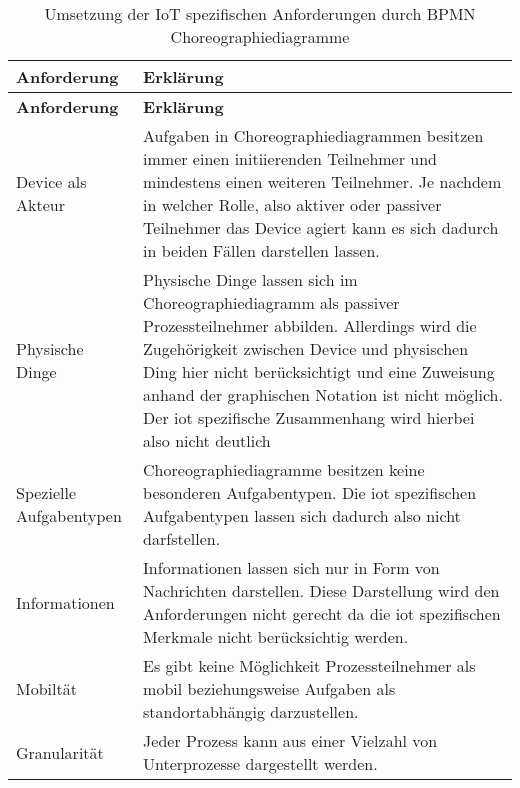  \begin{longtable}{P{4cm}|X}
  \caption{Umsetzung der IoT spezifischen Anforderungen durch BPMN Choreographiediagramme}\\
  \label{table:evaluierungskriterien}
  \textbf{Anforderung} & \textbf{Erklärung}   \\
  \hline
  \endfirsthead %
  \textbf{Anforderung} & \textbf{Erklärung}  \\
  \hline
  \endhead %
  Device als Akteur & Aufgaben in Choreographiediagrammen besitzen immer einen initiierenden Teilnehmer und mindestens einen weiteren Teilnehmer. Je nachdem in welcher Rolle, also aktiver oder passiver Teilnehmer das Device agiert kann es sich dadurch in beiden Fällen darstellen lassen.\\ \hline
  Physische Dinge  & Physische Dinge lassen sich im Choreographiediagramm als passiver Prozessteilnehmer abbilden. Allerdings wird die Zugehörigkeit zwischen Device und physischen Ding hier nicht berücksichtigt und eine Zuweisung anhand der graphischen Notation ist nicht möglich. Der \ac{iot} spezifische Zusammenhang wird hierbei also nicht deutlich\\ \hline
  Spezielle Aufgabentypen & Choreographiediagramme besitzen keine besonderen Aufgabentypen. Die \ac{iot} spezifischen Aufgabentypen lassen sich dadurch also nicht darfstellen. \\ \hline
  Informationen  &  Informationen lassen sich nur in Form von Nachrichten darstellen. Diese Darstellung wird den Anforderungen nicht gerecht da die \ac{iot} spezifischen Merkmale nicht berücksichtig werden.\\ \hline
  Mobiltät & Es gibt keine Möglichkeit Prozessteilnehmer als mobil beziehungsweise Aufgaben als standortabhängig darzustellen.\\ \hline
  Granularität & Jeder Prozess kann aus einer Vielzahl von Unterprozesse dargestellt werden.\\
 \end{longtable}
